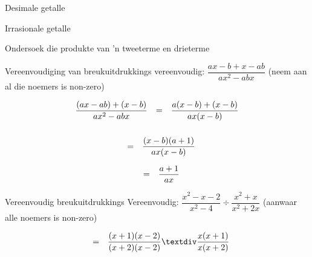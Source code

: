 \begin{Aktiwiteit}{Desimale getalle}
\begin{aktiwiteit}{Irrasionale getalle}
\begin{aktiwiteit}{Ondersoek die produkte van 'n tweeterme en drieterme}

\begin{wex}{ Vereenvoudiging van breukuitdrukkings }{vereenvoudig: $\dfrac{ax-b+x-ab}{a{x}^{2}-abx}$ (neem aan al die noemers is non-zero)}{


\par 


\begin{equation*}
\begin{array}{lll}\dfrac{(ax-ab)+(x-b)}{a{x}^{2}-abx}\hfill & =& \dfrac{a(x-b)+(x-b)}{ax(x-b)}\hfill \\ \end{array}
\end{equation*}
\begin{equation*}
\begin{array}{lll}
\\& =& \dfrac{(x-b)(a+1)}{ax(x-b)}\hfill \end{array}
\end{equation*}

\begin{equation*}
\begin{array}{ccc}& =& \dfrac{a+1}{ax}\hfill \end{array}
\end{equation*}
}
\end{wex}


\begin{wex}{Vereenvoudig breukuitdrukkings }
{Vereenvoudig: $\dfrac{{x}^{2}-x-2}{{x}^{2}-4}÷\dfrac{{x}^{2}+x}{{x}^{2}+2x}$  (aanwaar alle noemers is non-zero)} {
\begin{equation*}
\begin{array}{ccc}& =& \dfrac{(x+1)(x-2)}{(x+2)(x-2)}÷\dfrac{x(x+1)}{x(x+2)}\hfill \end{array}
\end{equation*}


}
\end{wex}
\end{aktiwiteit}
\end{aktiwiteit}
\end{Aktiwiteit}
